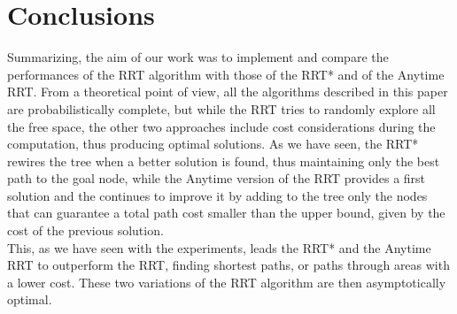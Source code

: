 \documentclass[10pt]{article}
\begin{document}
	\section{Conclusions}
	Summarizing, the aim of our work was to implement and compare the performances of the RRT algorithm with those of the RRT* and of the Anytime RRT. From a theoretical point of view, all the algorithms described in this paper are probabilistically complete, but while the RRT tries to randomly explore all the free space, the other two approaches include cost considerations during the computation,  thus producing optimal solutions.
	As we have seen, the RRT* rewires the tree when a better solution is found, thus maintaining only the best path to the goal node, while the Anytime version of the RRT provides a first solution and the continues to improve it by adding to the tree only the nodes that can guarantee a total path cost smaller than the upper bound, given by the cost of the previous solution.\\
	This, as we have seen with the experiments, leads the RRT* and the Anytime RRT to outperform the RRT, finding shortest paths, or paths through areas with a lower cost. These two variations of the RRT algorithm are then asymptotically optimal.\\
\end{document}
